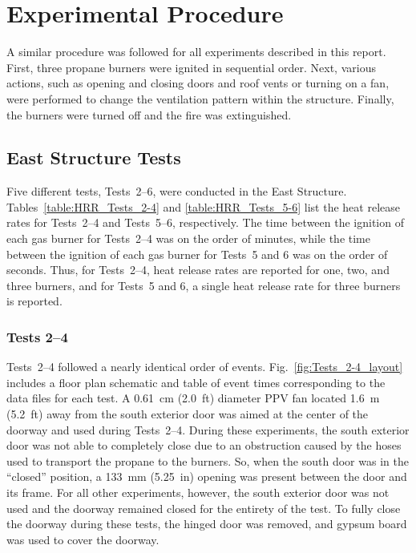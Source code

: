 \documentclass[12pt,oneside]{book}
\begin{document}
\clearpage

\chapter{Experimental Procedure}
\label{chap:Experimental_Procedure}
A similar procedure was followed for all experiments described in this report. First, three propane burners were ignited in sequential order. Next, various actions, such as opening and closing doors and roof vents or turning on a fan, were performed to change the ventilation pattern within the structure. Finally, the burners were turned off and the fire was extinguished.

\section{East Structure Tests}
\label{sec:east_procedure}
Five different tests, Tests~2--6, were conducted in the East Structure. Tables~\ref{table:HRR_Tests_2-4} and \ref{table:HRR_Tests_5-6} list the heat release rates for Tests~2--4 and Tests~5--6, respectively. The time between the ignition of each gas burner for Tests~2--4 was on the order of minutes, while the time between the ignition of each gas burner for Tests~5 and 6 was on the order of seconds. Thus, for Tests~2--4, heat release rates are reported for one, two, and three burners, and for Tests~5 and 6, a single heat release rate for three burners is reported.

\subsection{Tests 2--4}
Tests~2--4 followed a nearly identical order of events. Fig.~\ref{fig:Tests_2-4_layout} includes a floor plan schematic and table of event times corresponding to the data files for each test. A 0.61~cm (2.0~ft) diameter PPV fan located 1.6~m (5.2~ft) away from the south exterior door was aimed at the center of the doorway and used during Tests~2--4. During these experiments, the south exterior door was not able to completely close due to an obstruction caused by the hoses used to transport the propane to the burners. So, when the south door was in the ``closed'' position, a 133~mm (5.25~in) opening was present between the door and its frame. For all other experiments, however, the south exterior door was not used and the doorway remained closed for the entirety of the test. To fully close the doorway during these tests, the hinged door was removed, and gypsum board was used to cover the doorway.
\end{document}
